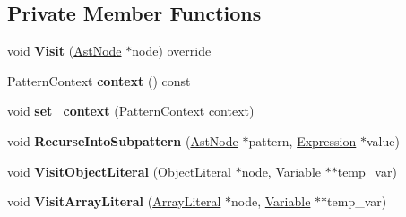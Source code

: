 \subsection*{Private Member Functions}
\begin{DoxyCompactItemize}
\item 
void {\bfseries Visit} (\hyperlink{classv8_1_1internal_1_1_ast_node}{Ast\+Node} $\ast$node) override\hypertarget{classv8_1_1internal_1_1_parser_1_1_pattern_rewriter_a9f46a4725179d84b891bbacc2cc7d22b}{}\label{classv8_1_1internal_1_1_parser_1_1_pattern_rewriter_a9f46a4725179d84b891bbacc2cc7d22b}

\item 
Pattern\+Context {\bfseries context} () const \hypertarget{classv8_1_1internal_1_1_parser_1_1_pattern_rewriter_a9179c7a1ea74c7cf1d9be08799b95b4a}{}\label{classv8_1_1internal_1_1_parser_1_1_pattern_rewriter_a9179c7a1ea74c7cf1d9be08799b95b4a}

\item 
void {\bfseries set\+\_\+context} (Pattern\+Context context)\hypertarget{classv8_1_1internal_1_1_parser_1_1_pattern_rewriter_a321c43a3b6eb938b9663b058c49910c0}{}\label{classv8_1_1internal_1_1_parser_1_1_pattern_rewriter_a321c43a3b6eb938b9663b058c49910c0}

\item 
void {\bfseries Recurse\+Into\+Subpattern} (\hyperlink{classv8_1_1internal_1_1_ast_node}{Ast\+Node} $\ast$pattern, \hyperlink{classv8_1_1internal_1_1_expression}{Expression} $\ast$value)\hypertarget{classv8_1_1internal_1_1_parser_1_1_pattern_rewriter_a3a659d1eaed6af7f11f7f895e6d26589}{}\label{classv8_1_1internal_1_1_parser_1_1_pattern_rewriter_a3a659d1eaed6af7f11f7f895e6d26589}

\item 
void {\bfseries Visit\+Object\+Literal} (\hyperlink{classv8_1_1internal_1_1_object_literal}{Object\+Literal} $\ast$node, \hyperlink{classv8_1_1internal_1_1_variable}{Variable} $\ast$$\ast$temp\+\_\+var)\hypertarget{classv8_1_1internal_1_1_parser_1_1_pattern_rewriter_a35c3c48eb9da1f4ac78db5f033ee073f}{}\label{classv8_1_1internal_1_1_parser_1_1_pattern_rewriter_a35c3c48eb9da1f4ac78db5f033ee073f}

\item 
void {\bfseries Visit\+Array\+Literal} (\hyperlink{classv8_1_1internal_1_1_array_literal}{Array\+Literal} $\ast$node, \hyperlink{classv8_1_1internal_1_1_variable}{Variable} $\ast$$\ast$temp\+\_\+var)\hypertarget{classv8_1_1internal_1_1_parser_1_1_pattern_rewriter_aca522a130bf9635d5c21615f91883acf}{}\label{classv8_1_1internal_1_1_parser_1_1_pattern_rewriter_aca522a130bf9635d5c21615f91883acf}


\end{DoxyCompactItemize}
